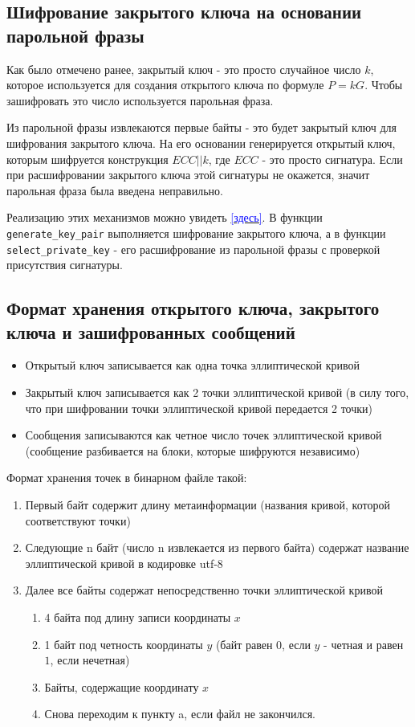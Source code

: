 \subsection{Шифрование закрытого ключа на основании парольной фразы}

Как было отмечено ранее, закрытый ключ - это просто случайное число $k$, которое используется для создания открытого ключа по формуле $P=kG$. Чтобы зашифровать это число используется парольная фраза.

Из парольной фразы извлекаются первые байты - это будет закрытый ключ для шифрования закрытого ключа. На его основании генерируется открытый ключ, которым шифруется конструкция $ECC||k$, где $ECC$ - это просто сигнатура. Если при расшифровании закрытого ключа этой сигнатуры не окажется, значит парольная фраза была введена неправильно. 

Реализацию этих механизмов можно увидеть \hyperref[sec:ec_encryption]{\textcolor{blue}{[здесь]}}. В функции \texttt{generate\_key\_pair} выполняется шифрование закрытого ключа, а в функции \texttt{select\_private\_key} - его расшифрование из парольной фразы с проверкой присутствия сигнатуры.

\subsection{Формат хранения открытого ключа, закрытого ключа и зашифрованных сообщений}

\begin{itemize}
	\item Открытый ключ записывается как одна точка эллиптической кривой
	\item Закрытый ключ записывается как 2 точки эллиптической кривой (в силу того, что при шифровании точки эллиптической кривой передается 2 точки)
	\item Сообщения записываются как четное число точек эллиптической кривой (сообщение разбивается на блоки, которые шифруются независимо)
\end{itemize}

Формат хранения точек в бинарном файле такой:

\begin{enumerate}
	\item Первый байт содержит длину метаинформации (названия кривой, которой соответствуют точки)
	\item Следующие n байт (число n извлекается из первого байта) содержат название эллиптической кривой в кодировке utf-8
	\item Далее все байты содержат непосредственно точки эллиптической кривой
	\begin{enumerate}
		\item 4 байта под длину записи координаты $x$
		\item 1 байт под четность координаты $y$ (байт равен $0$, если $y$ - четная и равен $1$, если нечетная)
		\item Байты, содержащие координату $x$
		\item Снова переходим к пункту a, если файл не закончился.
	\end{enumerate}
\end{enumerate}